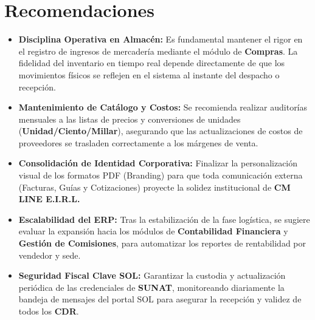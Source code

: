 \FloatBarrier
\clearpage
\section{Recomendaciones}

\begin{itemize}
    \item \textbf{Disciplina Operativa en Almacén:} Es fundamental mantener el rigor en el registro de ingresos de mercadería mediante el módulo de \textbf{Compras}. La fidelidad del inventario en tiempo real depende directamente de que los movimientos físicos se reflejen en el sistema al instante del despacho o recepción.
    \item \textbf{Mantenimiento de Catálogo y Costos:} Se recomienda realizar auditorías mensuales a las listas de precios y conversiones de unidades (\textbf{Unidad/Ciento/Millar}), asegurando que las actualizaciones de costos de proveedores se trasladen correctamente a los márgenes de venta.
    \item \textbf{Consolidación de Identidad Corporativa:} Finalizar la personalización visual de los formatos PDF (Branding) para que toda comunicación externa (Facturas, Guías y Cotizaciones) proyecte la solidez institucional de \textbf{CM LINE E.I.R.L.}
    \item \textbf{Escalabilidad del ERP:} Tras la estabilización de la fase logística, se sugiere evaluar la expansión hacia los módulos de \textbf{Contabilidad Financiera} y \textbf{Gestión de Comisiones}, para automatizar los reportes de rentabilidad por vendedor y sede.
    \item \textbf{Seguridad Fiscal Clave SOL:} Garantizar la custodia y actualización periódica de las credenciales de \textbf{SUNAT}, monitoreando diariamente la bandeja de mensajes del portal SOL para asegurar la recepción y validez de todos los \textbf{CDR}.
\end{itemize}
